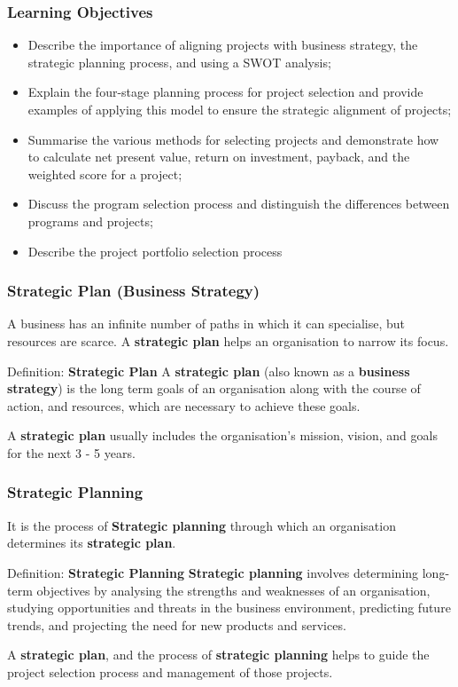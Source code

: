 \documentclass{beamer}
\begin{document}
\begin{frame}
\frametitle{Learning Objectives}
\begin{itemize}
\item Describe the importance of aligning projects with business strategy, the strategic planning process, and using a SWOT analysis;
\item Explain the four-stage planning process for project selection and provide examples of applying this model to ensure the strategic alignment of projects;
\item Summarise the various methods for selecting projects and demonstrate how to calculate net present value, return on investment, payback, and the weighted score for a project;
\item Discuss the program selection process and distinguish the differences between programs and projects;
\item Describe the project portfolio selection process
\end{itemize}
\end{frame}

\begin{frame}
\frametitle{Strategic Plan (Business Strategy)}
A business has an infinite number of paths in which it can specialise, but resources are scarce. A \textbf{strategic plan} helps an organisation to narrow its focus.
\vspace{0.5cm}
\begin{block}{Definition: \textbf{Strategic Plan}}
A \textbf{strategic plan} (also known as a \textbf{business strategy}) is the long term goals of an organisation along with the course of action, and resources, which are necessary to achieve these goals.
\end{block}
\vspace{0.5cm}
A \textbf{strategic plan} usually includes the organisation's mission, vision, and goals for the next 3 - 5 years.
\end{frame}

\begin{frame}
\frametitle{Strategic Planning}
 It is the process of \textbf{Strategic planning} through which an organisation determines its \textbf{strategic plan}.

\vspace{0.5cm}
\begin{block}{Definition: \textbf{Strategic Planning}}
\textbf{Strategic planning} involves determining long-term objectives by analysing the strengths and weaknesses of an organisation, studying opportunities and threats in the business environment, predicting future trends, and projecting the need for new products and services.
\end{block}
\vspace{0.5cm}

A \textbf{strategic plan}, and the process of \textbf{strategic planning} helps to guide the project selection process and management of those projects.
\end{frame}
\end{document}
